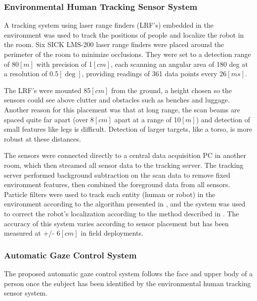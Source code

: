 \documentclass[journal]{IEEEtran}
\begin{document}
\subsubsection{Environmental Human Tracking Sensor System}
\label{subsubsec:humanTracker}
A tracking system using laser range finders (LRF's) embedded in the environment was used to track the positions of people and localize the robot in the room. Six SICK LMS-200 laser range finders were placed around the perimeter of the room to minimize occlusions. They were set to a detection range of 80$[m]$ with precision of 1$[cm]$, each scanning an angular area of 180 deg at a resolution of 0.5$[\deg]$, providing readings of 361 data points every 26$[ms]$.

The LRF's were mounted 85$[cm]$ from the ground, a height chosen so the sensors could see above clutter and obstacles such as benches and luggage. Another reason for this placement was that at long range, the scan beams are spaced quite far apart (over 8$[cm]$ apart at a range of 10$[m]$) and detection of small features like legs is difficult. Detection of larger targets, like a torso, is more robust at these distances.

The sensors were connected directly to a central data acquisition PC in another room, which then streamed all sensor data to the tracking server. The tracking server performed background subtraction on the scan data to remove fixed environment features, then combined the foreground data from all sensors. Particle filters were used to track each entity (human or robot) in the environment according to the algorithm presented in \cite{glas:laser}, and the system was used to correct the robot's localization according to the method described in \cite{glas-iros2010}. The accuracy of this system varies according to sensor placement but has been measured at +/- 6$[cm]$ in field deployments.


\subsubsection{Automatic Gaze Control System}
The proposed automatic gaze control system follows the face and upper body of a person once the subject has been identified by the environmental human tracking sensor system. 
\end{document}
